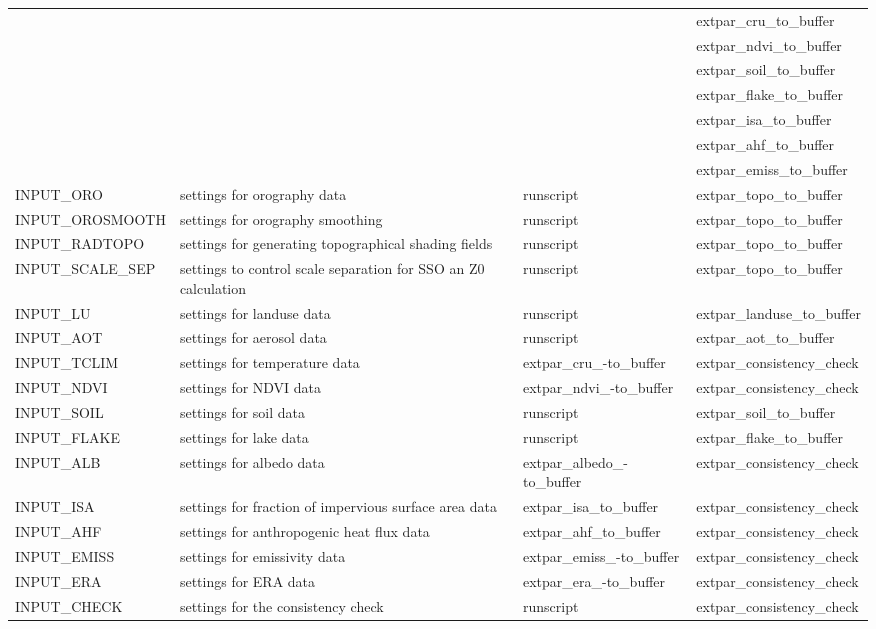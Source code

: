 \documentclass[a4paper,10pt,DIV14,BCOR1cm,titlepage,twoside]{scrartcl}
\providecommand{\tabularnewline}{\\}
\begin{document}
\begin{longtable}{|p{3.5cm}|p{4.8cm}|p{2.4cm}|p{3.8cm}|}
 & & & extpar\_cru\_to\_buffer \\ 
 & & & extpar\_ndvi\_to\_buffer \\
 & & & extpar\_soil\_to\_buffer \\
 & & & extpar\_flake\_to\_buffer \\
 & & & extpar\_isa\_to\_buffer \\
 & & & extpar\_ahf\_to\_buffer \\
 & & & extpar\_emiss\_to\_buffer \\
\hline 
 INPUT\_ORO & settings for orography data & runscript & extpar\_topo\_to\_buffer \\
\hline
 INPUT\_OROSMOOTH & settings for orography smoothing & runscript & extpar\_topo\_to\_buffer \\
\hline 
 INPUT\_RADTOPO & settings for generating topographical shading fields & runscript & extpar\_topo\_to\_buffer \\
\hline 
 INPUT\_SCALE\_SEP & settings to control scale separation for SSO an Z0 calculation & runscript & extpar\_topo\_to\_buffer \\
\hline 
 INPUT\_LU & settings for landuse data & runscript &  extpar\_landuse\_to\_buffer \\
\hline 
 INPUT\_AOT & settings for aerosol data  & runscript &  extpar\_aot\_to\_buffer \\
\hline
  INPUT\_TCLIM  & settings for temperature data     &  extpar\_cru\_-to\_buffer & extpar\_consistency\_check \tabularnewline
\hline 
INPUT\_NDVI & settings for NDVI data & extpar\_ndvi\_-to\_buffer & extpar\_consistency\_check \tabularnewline
\hline 
INPUT\_SOIL & settings for soil data & runscript & extpar\_soil\_to\_buffer \\
\hline 
INPUT\_FLAKE & settings for lake data & runscript & extpar\_flake\_to\_buffer \\
\hline
INPUT\_ALB & settings for albedo data & extpar\_albedo\_-to\_buffer & extpar\_consistency\_check \tabularnewline
\hline
INPUT\_ISA & settings for fraction of impervious surface area data & extpar\_isa\_to\_buffer & extpar\_consistency\_check \\
\hline
INPUT\_AHF & settings for anthropogenic heat flux data & extpar\_ahf\_to\_buffer & extpar\_consistency\_check \\
\hline
INPUT\_EMISS & settings for emissivity data & extpar\_emiss\_-to\_buffer & extpar\_consistency\_check \tabularnewline
\hline
INPUT\_ERA & settings for ERA data & extpar\_era\_-to\_buffer & extpar\_consistency\_check \tabularnewline
\hline
INPUT\_CHECK & settings for the consistency check & runscript & extpar\_consistency\_check \\
\hline 
\bottomrule
\end{longtable}
\end{document}
